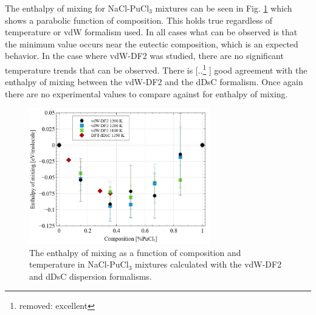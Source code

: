 \documentclass[review]{elsarticle}
\providecommand{\DIFaddtex}[1]{{\protect\color{blue} \sf #1}} %
\providecommand{\DIFdeltex}[1]{{\protect\color{red} [..\footnote{removed: #1} ]}} %
\providecommand{\DIFaddbegin}{} %
\providecommand{\DIFaddend}{} %
\providecommand{\DIFdelbegin}{} %
\providecommand{\DIFdelend}{} %
\providecommand{\DIFadd}[1]{\texorpdfstring{\DIFaddtex{#1}}{#1}} %
\providecommand{\DIFdel}[1]{\texorpdfstring{\DIFdeltex{#1}}{}} %
\newcommand{\DIFscaledelfig}{0.5}
\newlength{\DIFdelgraphicswidth} %
\newlength{\DIFdelgraphicsheight} %
\newcommand{\DIFaddincludegraphics}[2][]{{\color{blue}\fbox{\DIFOincludegraphics[#1]{#2}}}} %
\newcommand{\DIFdelincludegraphics}[2][]{%
\sbox{\DIFdelgraphicsbox}{\DIFOincludegraphics[#1]{#2}}%
\settoboxwidth{\DIFdelgraphicswidth}{\DIFdelgraphicsbox} %
\settoboxtotalheight{\DIFdelgraphicsheight}{\DIFdelgraphicsbox} %
\scalebox{\DIFscaledelfig}{%
\parbox[b]{\DIFdelgraphicswidth}{\usebox{\DIFdelgraphicsbox}\\[-\baselineskip] \rule{\DIFdelgraphicswidth}{0em}}\llap{\resizebox{\DIFdelgraphicswidth}{\DIFdelgraphicsheight}{%
\setlength{\unitlength}{\DIFdelgraphicswidth}%
\begin{picture}(1,1)%
\thicklines\linethickness{2pt} %
{\color[rgb]{1,0,0}\put(0,0){\framebox(1,1){}}}%
{\color[rgb]{1,0,0}\put(0,0){\line( 1,1){1}}}%
{\color[rgb]{1,0,0}\put(0,1){\line(1,-1){1}}}%
\end{picture}%
}\hspace*{3pt}}} %
} %
\DeclareRobustCommand{\DIFaddbegin}{\DIFOaddbegin \let\includegraphics\DIFaddincludegraphics} %
\DeclareRobustCommand{\DIFaddend}{\DIFOaddend \let\includegraphics\DIFOincludegraphics} %
\DeclareRobustCommand{\DIFdelbegin}{\DIFOdelbegin \let\includegraphics\DIFdelincludegraphics} %
\DeclareRobustCommand{\DIFdelend}{\DIFOaddend \let\includegraphics\DIFOincludegraphics} %
\begin{document}
The enthalpy of mixing for NaCl-PuCl$_3$ mixtures can be seen in Fig. \ref{fig:mixing} which shows a parabolic function of composition. This holds true regardless of temperature or vdW formalism used. In all cases what can be observed is that the minimum value occurs near the eutectic composition, which is an expected behavior. In the case where vdW-DF2 was studied, there are no significant temperature trends that can be observed. There is \DIFdelbegin \DIFdel{excellent }\DIFdelend \DIFaddbegin \DIFadd{good }\DIFaddend agreement with the enthalpy of mixing between the vdW-DF2 and the dDsC formalism. Once again there are no experimental values to compare against for enthalpy of mixing.

\begin{figure}[h!]
 \centering
 \includegraphics[width=0.7\textwidth]{mixing.jpg} 
 \caption{The enthalpy of mixing as a function of composition and temperature in NaCl-PuCl$_3$ mixtures calculated with the vdW-DF2 and dDsC dispersion formalisms.}
 \label{fig:mixing}
\end{figure} 


\FloatBarrier
\end{document}

